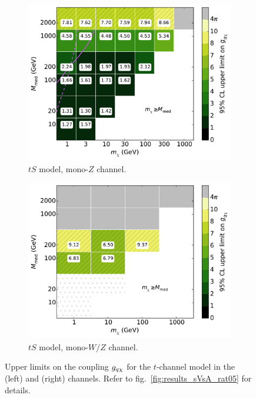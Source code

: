\begin{figure}
  \centering
  \begin{subfigure}[t]{0.495\textwidth}
    \centering
    \includegraphics[width=1.\textwidth]{figures/grid_allpoints_TSD_rat1.pdf}
    \caption{$tS$ model, mono-$Z$ channel.}
  \end{subfigure}
  \begin{subfigure}[t]{0.495\textwidth}
    \centering
    \includegraphics[width=1.\textwidth]{figures/grid_basepoints_TSD_rat1_monoWZ.pdf}
    \caption{$tS$ model, mono-$W/Z$ channel.}
  \end{subfigure}
  \caption{Upper limits on the coupling $g_{q \chi}$ for the $t$-channel model in the \monoZ (left) and \monoWZ (right) channels. Refer to fig.~\ref{fig:results_sVsA_rat05} for details.}
  \label{fig:results_tS}
\end{figure}

